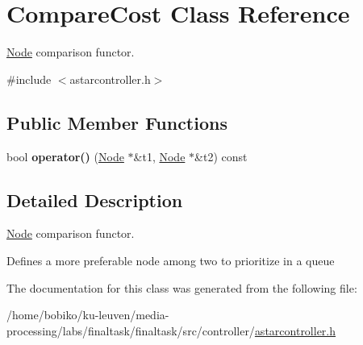\hypertarget{classCompareCost}{}\section{Compare\+Cost Class Reference}
\label{classCompareCost}


\hyperlink{structNode}{Node} comparison functor.  




{\ttfamily \#include $<$astarcontroller.\+h$>$}

\subsection*{Public Member Functions}
\begin{DoxyCompactItemize}
\item 
bool {\bfseries operator()} (\hyperlink{structNode}{Node} $\ast$\&t1, \hyperlink{structNode}{Node} $\ast$\&t2) const \hypertarget{classCompareCost_adfeec8d428c577eab5d58c46dd692959}{}\label{classCompareCost_adfeec8d428c577eab5d58c46dd692959}

\end{DoxyCompactItemize}


\subsection{Detailed Description}
\hyperlink{structNode}{Node} comparison functor. 

Defines a more preferable node among two to prioritize in a queue 

The documentation for this class was generated from the following file\+:\begin{DoxyCompactItemize}
\item 
/home/bobiko/ku-\/leuven/media-\/processing/labs/finaltask/finaltask/src/controller/\hyperlink{astarcontroller_8h}{astarcontroller.\+h}\end{DoxyCompactItemize}
